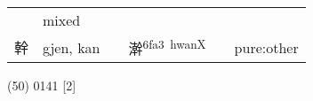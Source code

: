 \documentclass[14pt,a4paper]{scrartcl}
\begin{document}
\begin{longtable}[c]{@{}llllll@{}}
\begin{minipage}[t]{0.14\columnwidth}
\strut\end{minipage} &
\begin{minipage}[t]{0.14\columnwidth}\raggedright\strut
mixed
\strut\end{minipage}\tabularnewline
\begin{minipage}[t]{0.14\columnwidth}\raggedright\strut
幹
\strut\end{minipage} &
\begin{minipage}[t]{0.14\columnwidth}\raggedright\strut
gjen, kan
\strut\end{minipage} &
\begin{minipage}[t]{0.14\columnwidth}\raggedright\strut
\strut\end{minipage} &
\begin{minipage}[t]{0.14\columnwidth}\raggedright\strut
澣\textsuperscript{6fa3~hwanX}
\strut\end{minipage} &
\begin{minipage}[t]{0.14\columnwidth}\raggedright\strut
\strut\end{minipage} &
\begin{minipage}[t]{0.14\columnwidth}\raggedright\strut
pure:other
\strut\end{minipage}\tabularnewline
\bottomrule
\end{longtable}

(50) 0141 {[}2{]}
\end{document}
